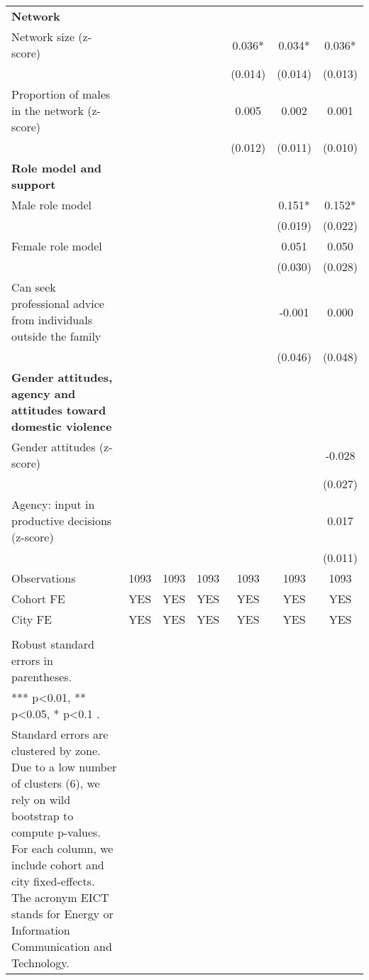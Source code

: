 \begin{landscape}
\begin{longtable}{m{9cm}cccccc}
\textbf{Network}&&&&&&\\
Network size (z-score)&&&&0.036*&0.034*&0.036*\\
&&&&(0.014)&(0.014)&(0.013)\\
Proportion of males in the network (z-score) &&&&0.005&0.002&0.001\\
&&&&(0.012)&(0.011)&(0.010)\\
\textbf{Role model and support}&&&&&&\\
Male role model&&&&&0.151*&0.152*\\
&&&&&(0.019)&(0.022)\\
Female role model&&&&&0.051&0.050\\
&&&&&(0.030)&(0.028)\\
Can seek professional advice from individuals outside the family &&&&&-0.001&0.000\\
&&&&&(0.046)&(0.048)\\
\textbf{Gender attitudes, agency and attitudes toward domestic violence}&&&&&&\\
Gender attitudes (z-score)&&&&&&-0.028\\
&&&&&&(0.027)\\
Agency: input in productive decisions (z-score) &&&&&&0.017\\
&&&&&&(0.011)\\
Observations&1093&1093&1093&1093&1093&1093\\
Cohort FE&YES&YES&YES&YES&YES&YES\\
City FE&YES&YES&YES&YES&YES&YES\\
\midrule
\begin{minipage}{21cm}
\small{
{\textit Notes:} \\
Robust standard errors in parentheses. \\
*** p\textless{}0.01, ** p\textless{}0.05, * p\textless{}0.1 . \\
Standard errors are clustered by zone. Due to a low number of clusters (6), we rely on wild bootstrap to compute p-values. For each column, we include cohort and city fixed-effects. The acronym EICT stands for Energy or Information Communication and Technology.
}
\end{minipage} \\* \bottomrule
\end{longtable}
\end{landscape}
